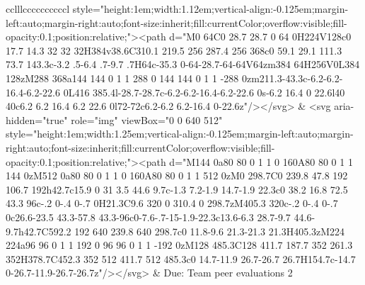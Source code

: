 \documentclass[
]{article}
\begin{document}
\begin{figure*}
\begin{longtable*}{cclllccccccccccl}
style="height:1em;width:1.12em;vertical-align:-0.125em;margin-left:auto;margin-right:auto;font-size:inherit;fill:currentColor;overflow:visible;fill-opacity:0.1;position:relative;"><path d="M0 64C0 28.7 28.7 0 64 0H224V128c0 17.7 14.3 32 32 32H384v38.6C310.1 219.5 256 287.4 256 368c0 59.1 29.1 111.3 73.7 143.3c-3.2 .5-6.4 .7-9.7 .7H64c-35.3 0-64-28.7-64-64V64zm384 64H256V0L384 128zM288 368a144 144 0 1 1 288 0 144 144 0 1 1 -288 0zm211.3-43.3c-6.2-6.2-16.4-6.2-22.6 0L416 385.4l-28.7-28.7c-6.2-6.2-16.4-6.2-22.6 0s-6.2 16.4 0 22.6l40 40c6.2 6.2 16.4 6.2 22.6 0l72-72c6.2-6.2 6.2-16.4 0-22.6z"/></svg> & <svg aria-hidden="true" role="img" viewBox="0 0 640 512" style="height:1em;width:1.25em;vertical-align:-0.125em;margin-left:auto;margin-right:auto;font-size:inherit;fill:currentColor;overflow:visible;fill-opacity:0.1;position:relative;"><path d="M144 0a80 80 0 1 1 0 160A80 80 0 1 1 144 0zM512 0a80 80 0 1 1 0 160A80 80 0 1 1 512 0zM0 298.7C0 239.8 47.8 192 106.7 192h42.7c15.9 0 31 3.5 44.6 9.7c-1.3 7.2-1.9 14.7-1.9 22.3c0 38.2 16.8 72.5 43.3 96c-.2 0-.4 0-.7 0H21.3C9.6 320 0 310.4 0 298.7zM405.3 320c-.2 0-.4 0-.7 0c26.6-23.5 43.3-57.8 43.3-96c0-7.6-.7-15-1.9-22.3c13.6-6.3 28.7-9.7 44.6-9.7h42.7C592.2 192 640 239.8 640 298.7c0 11.8-9.6 21.3-21.3 21.3H405.3zM224 224a96 96 0 1 1 192 0 96 96 0 1 1 -192 0zM128 485.3C128 411.7 187.7 352 261.3 352H378.7C452.3 352 512 411.7 512 485.3c0 14.7-11.9 26.7-26.7 26.7H154.7c-14.7 0-26.7-11.9-26.7-26.7z"/></svg> & Due: Team peer evaluations 2 \\ 

\end{longtable*}
\end{figure*}
\end{document}
